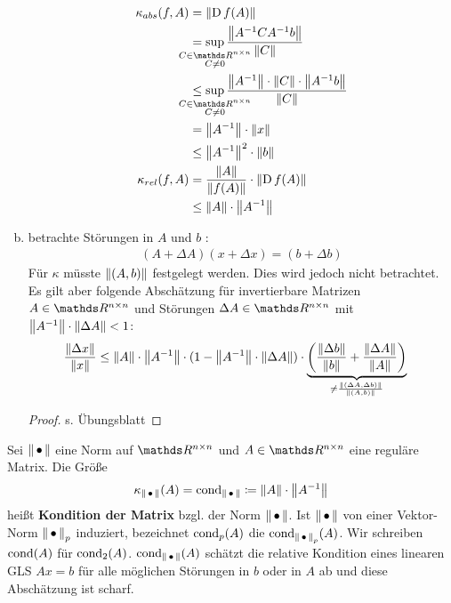 \begin{Bspe}
\begin{enumerate}[a)]
    \begin{align}
      \nonumber
      \kappa_{abs} (f,A) 
      &= \nn[\D f(A)] \\ \nonumber
      &= \sup_{\mathclap{\substack{
        C \in \R^{n\times n} \\
      C\neq 0								  	
      }}}
      \frac{\nn[A^{-1}CA^{-1}b]}{\nn[C]} \\ \nonumber
      &\leq \sup_{\mathclap{\substack{ 
        C \in \R^{n\times n}\\
      C \neq 0
      }}}
      \frac{\nn[A^{-1}]\cdot\nn[C]\cdot\nn[A^{-1}b]}{\nn[C]} \\ \nonumber
      &= \nn[A^{-1}] \cdot\nn[x] \\ \nonumber
      &\leq   \nn[A^{-1}]^2 \cdot\nn[b] \\ \nonumber
      \kappa_{rel}(f,A)  &= \frac{\nn[A]}{\nn[f(A)]} \cdot \nn[\D f(A)] \\
      &\leq \nn[A]\cdot \nn[A^{-1}] \label{III.2.10}
    \end{align}
  \item betrachte Störungen in $A$ und $b$ :
    \begin{gather*}
      (A+\Delta A)(x+\Delta x) = (b+\Delta b) 
    \end{gather*}
    Für $\kappa$ müsste $\nn[(A,b)]$ festgelegt werden. Dies wird jedoch nicht betrachtet. Es gilt aber folgende Abschätzung für invertierbare Matrizen $A\in \Renn $ und Störungen
    $\Delta A \in \R^{n\times n}$ mit $\nn[A^{-1}]\cdot \nn[\Delta A] < 1$:
    \begin{align}
      \frac{\nn[\Delta x]}{\nn[x]} & \leq \nn[A] \cdot \nn[A^{-1}]\cdot (1- \nn[A^{-1}]\cdot \nn[\Delta A]) 
                                     \cdot
                                     \underbrace{\left(  \frac{\nn[\Delta b]}{\nn[b]} +  \frac{\nn[\Delta A]}{\nn[A]}  \right)}_{\neq  \frac{\nn[(\Delta A, \Delta b)]}{\nn[(A,b)]} }
                                     \label{III.2.11}
    \end{align}
    \begin{proof} s. Übungsblatt \end{proof}
  \end{enumerate}
\end{Bspe}

\begin{Defe}
  Sei $\nn$ eine Norm auf $\R^{n\times n} $ und $A\in \R^{n\times n}$ eine reguläre Matrix.
  Die Größe
  \begin{gather*}
    \kappa_{\nn}(A) = \Cond_{\nn} \coloneqq \nn[A] \cdot \nn[A^{-1}]
  \end{gather*}
  heißt \textbf{Kondition der Matrix} bzgl. der Norm ${\nn}$.
  Ist  ${\nn}$ von einer Vektor-Norm ${\nn}_p$ induziert,
  bezeichnet $\Cond_p(A)$ die $\Cond_{\nn_p}(A)$. 
  Wir schreiben $\Cond(A)$ für $\Cond_2(A)$.
  $\Cond_{\nn}(A) $ schätzt die relative Kondition 
  eines linearen GLS $Ax=b$ für alle möglichen 
  Störungen in $b$ oder in $A$ ab und diese Abschätzung ist scharf.
\end{Defe}



